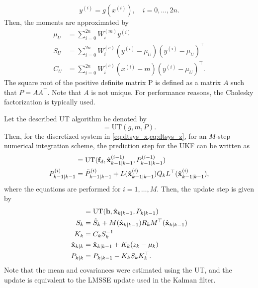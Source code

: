\documentclass[../zhang_thesis.tex]{subfiles}
\begin{document}
\begin{equation}
    y^{(i)} = g(x^{(i)}), \quad i=0,\dots,2n. \label{eq:ut3}
\end{equation}
Then, the moments are approximated by
\begin{align}
    \mu_U & = \sum_{i=0}^{2n} W_i^{(m)} y^{(i)} \\
    S_U & = \sum_{i=0}^{2n} W_i^{(c)} ( y^{(i)} - \mu_U ) ( y^{(i)} - \mu_U )^\top \\
    C_U & = \sum_{i=0}^{2n} W_i^{(c)} ( x^{(i)} - m ) ( y^{(i)} - \mu_U )^\top. \label{eq:ut4}
\end{align}
The square root of the positive definite matrix P is defined as a matrix $A$ such that $P=AA^\top$. Note that $A$ is not unique. For performance reasons, the Cholesky factorization is typically used.

Let the described UT algorithm be denoted by
\begin{equation}
    [\mu_U,S_U,C_U] = \mathrm{UT}(g,m,P).
\end{equation}
Then, for the discretized system in \cref{eq:dtsys_x,eq:dtsys_z}, for an $M$-step numerical integration scheme, the prediction step for the UKF can be written as
\begin{align}
    [\hat{\vx}_{k-1|k-1}^{(i)},\tilde{P}_{k-1|k-1}^{(i)}] & = \mathrm{UT}(\vf_d,\hat{\vx}_{k-1|k-1}^{(i-1)},P_{k-1|k-1}^{(i-1)}) \label{eq:ukfp1} \\
	P_{k-1|k-1}^{(i)} & = \tilde{P}_{k-1|k-1}^{(i)} + L(\hat{\vx}_{k-1|k-1}^{(i)}) Q_k L^\top(\hat{\vx}_{k-1|k-1}^{(i)}), \\
\end{align}
where the equations are performed for $i=1,\dots,M$. Then, the update step is given by
\begin{align}
	[\mu_k,\tilde{S}_k,C_k] & = \mathrm{UT}(\mathbf{h},\hat{\vx}_{k|k-1},P_{k|k-1}) \label{eq:ukfu1} \\
    S_k & = \tilde{S}_k + M(\hat{\vx}_{k|k-1}) R_k M^\top(\hat{\vx}_{k|k-1}) \\
    K_k & = C_k S_k^{-1} \\
    \hat{\vx}_{k|k} & = \hat{\vx}_{k|k-1}+ K_k (z_k-\mu_k) \\
	P_{k|k} & = P_{k|k-1}- K_k S_k K_k^\top. \label{eq:ukful}
\end{align}
Note that the mean and covariances were estimated using the UT, and the update is equivalent to the LMSSE update used in the Kalman filter.
\end{document}
